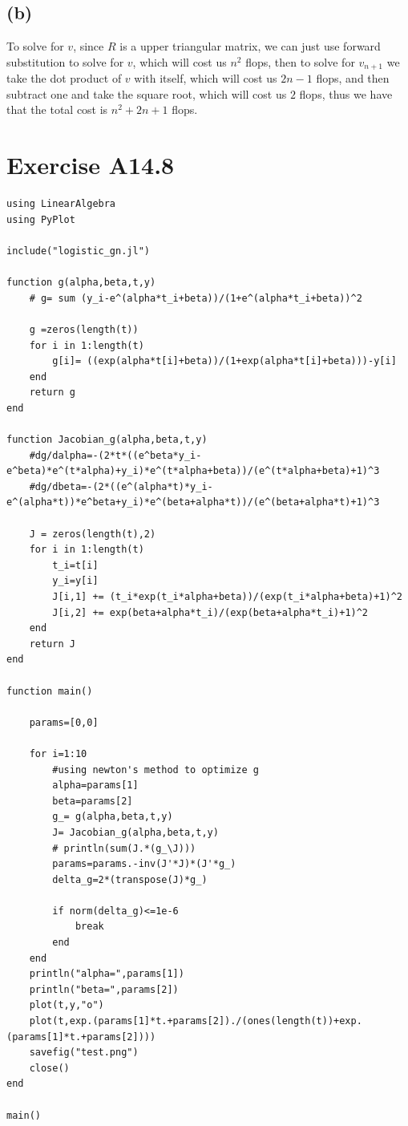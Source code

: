 \subsection*{(b)}
To solve for $v$, since $R$ is a upper triangular matrix, we can just use
forward substitution to solve for $v$, which will cost us $n^2$ flops, 
then to solve for $v_{n+1}$ we take the dot product of $v$ with itself,
which will cost us $2n-1$ flops, and then subtract one and take the square 
root, which will cost us $2$ flops, thus we have that the total cost is
$\boxed{n^2+2n+1}$ flops.
\section*{Exercise A14.8}
\begin{verbatim}
using LinearAlgebra
using PyPlot

include("logistic_gn.jl")

function g(alpha,beta,t,y)
    # g= sum (y_i-e^(alpha*t_i+beta))/(1+e^(alpha*t_i+beta))^2

    g =zeros(length(t))
    for i in 1:length(t)
        g[i]= ((exp(alpha*t[i]+beta))/(1+exp(alpha*t[i]+beta)))-y[i]
    end
    return g
end

function Jacobian_g(alpha,beta,t,y)
    #dg/dalpha=-(2*t*((e^beta*y_i-e^beta)*e^(t*alpha)+y_i)*e^(t*alpha+beta))/(e^(t*alpha+beta)+1)^3
    #dg/dbeta=-(2*((e^(alpha*t)*y_i-e^(alpha*t))*e^beta+y_i)*e^(beta+alpha*t))/(e^(beta+alpha*t)+1)^3

    J = zeros(length(t),2)
    for i in 1:length(t)
        t_i=t[i]
        y_i=y[i]
        J[i,1] += (t_i*exp(t_i*alpha+beta))/(exp(t_i*alpha+beta)+1)^2
        J[i,2] += exp(beta+alpha*t_i)/(exp(beta+alpha*t_i)+1)^2
    end
    return J
end

function main()

    params=[0,0]

    for i=1:10
        #using newton's method to optimize g 
        alpha=params[1]
        beta=params[2]
        g_= g(alpha,beta,t,y)
        J= Jacobian_g(alpha,beta,t,y)
        # println(sum(J.*(g_\J)))
        params=params.-inv(J'*J)*(J'*g_)
        delta_g=2*(transpose(J)*g_)

        if norm(delta_g)<=1e-6
            break
        end
    end
    println("alpha=",params[1])
    println("beta=",params[2])
    plot(t,y,"o")
    plot(t,exp.(params[1]*t.+params[2])./(ones(length(t))+exp.(params[1]*t.+params[2])))
    savefig("test.png")
    close()
end

main()
\end{verbatim}
